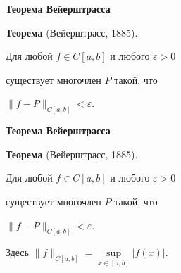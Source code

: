 \documentclass[11pt]{article}
\begin{document}
\newpage

\begin{center}
{\color{notaeYELLOW}\bfseries\fontsize{44}{52}\selectfont Теорема Вейерштрасса}
\end{center}
\vspace*{\fill}
\begin{center}
\fontsize{36}{43}\selectfont
\textbf{Теорема} (Вейерштрасс, 1885).\par\vspace{0.4in}
Для любой $f \in C[a,b]$ и любого $\varepsilon>0$\par\vspace{0.4in}
существует многочлен $P$ такой, что\par\vspace{0.4in}
$\|f - P\|_{C[a,b]} < \varepsilon.$\par\vspace{0.4in}
\end{center}
\vspace*{\fill}

\newpage

\begin{center}
{\color{notaeYELLOW}\bfseries\fontsize{44}{52}\selectfont Теорема Вейерштрасса}
\end{center}
\vspace*{\fill}
\begin{center}
\fontsize{36}{43}\selectfont
\textbf{Теорема} (Вейерштрасс, 1885).\par\vspace{0.4in}
Для любой $f \in C[a,b]$ и любого $\varepsilon>0$\par\vspace{0.4in}
существует многочлен $P$ такой, что\par\vspace{0.4in}
$\|f - P\|_{C[a,b]} < \varepsilon.$\par\vspace{0.4in}
Здесь $\|f\|_{C[a,b]}=\sup\limits_{x\in[a,b]}|f(x)|$.\par\vspace{0.4in}
\end{center}
\vspace*{\fill}

\newpage
\end{document}

